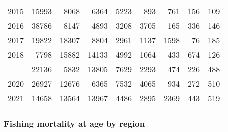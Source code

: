 \documentclass[
]{article}
\begin{document}
\begin{longtable}[t]{lrrrrrrrr}
2015 & 15993 & 8068 & 6364 & 5223 & 893 & 761 & 156 & 109\\
2016 & 38786 & 8147 & 4893 & 3208 & 3705 & 165 & 336 & 146\\
2017 & 19822 & 18307 & 8804 & 2961 & 1137 & 1598 & 76 & 185\\
2018 & 7798 & 15882 & 14133 & 4992 & 1064 & 433 & 674 & 126\\
\addlinespace
2019 & 22136 & 5832 & 13805 & 7629 & 2293 & 474 & 226 & 488\\
2020 & 26927 & 12676 & 6365 & 7532 & 4065 & 934 & 272 & 510\\
2021 & 14658 & 13564 & 13967 & 4486 & 2895 & 2369 & 443 & 519\\*
\end{longtable}

\hypertarget{fishing-mortality-at-age-by-region}{%
\subsubsection{Fishing mortality at age by
region}\label{fishing-mortality-at-age-by-region}}
\end{document}
